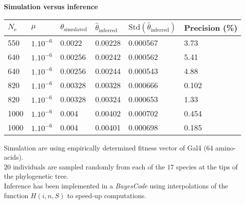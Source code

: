 \documentclass[8pt]{beamer}
\newcommand{\Ne}{N_\mathrm{e}}
\begin{document}
	\begin{frame}
	\textbf{\large Simulation versus inference }\\
	\vspace{1.5em}
		\begin{center}
			\begin{large}
				\begin{tabular}{|l|l|l|l|l|l|}
				\hline
				$\Ne$ & $\mu$	& $\theta_{\text{simulated}}$ & $\widehat{\theta}_{\text{inferred}}$	& $\textrm{Std} \left(\widehat{\theta}_{\text{inferred}}\right)$ &	Precision (\%)\\
				\hline
				550 & $1.10^{-6}$&	0.0022&	0.00228	&0.000567	& 3.73\\
				\hline
				640 & $1.10^{-6}$&	0.00256&	0.00242&	0.000562&	5.41\\
				\hline
				640 & $1.10^{-6}$&	0.00256&	0.00244&	0.000543&	4.88\\
				\hline
				820 & $1.10^{-6}$&	0.00328&	0.00328&	0.000666&	0.102\\
				\hline
				820 & $1.10^{-6}$&	0.00328&	0.00324&	0.000653&	1.33\\
				\hline
				1000 & $1.10^{-6}$&	0.004&	0.00402	&0.000702	&0.454\\
				\hline
				1000 & $1.10^{-6}$&	0.004&	0.00401&	0.000698	&0.185\\
				\hline
				\end{tabular}
			\end{large}
		\end{center}
	Simulation are using empirically determined fitness vector of Gal4 (64 amino-acids).\\
	$20$ individuals are sampled randomly from each of the $17$ species at the tips of the phylogenetic tree.\\
	\vspace{0.5em}
	Inference has been implemented in a \textit{BayesCode} using interpolations of the function $H(i, n, S)$ to speed-up computations.
	\end{frame}
\end{document}

